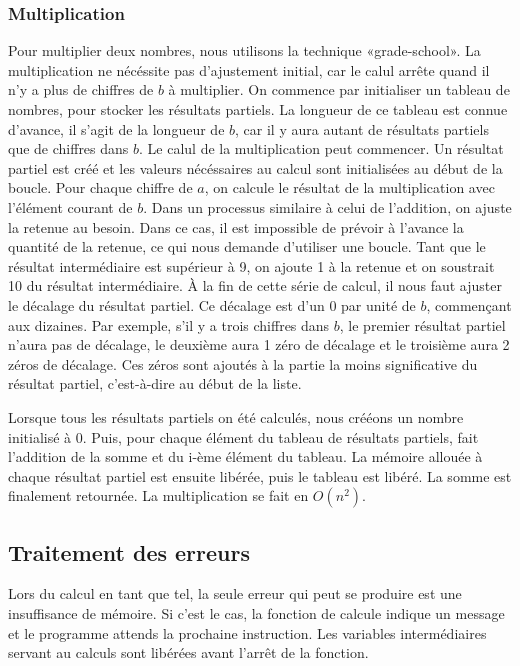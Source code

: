 \documentclass[letterpaper,12pt]{scrartcl}
\begin{document}
            \subsubsection{Multiplication}
             Pour multiplier deux nombres, nous utilisons la technique «grade-school». La multiplication ne nécéssite pas d'ajustement initial, car le calul arrête quand il n'y a plus de chiffres de $b$ à multiplier. On commence par initialiser un tableau de nombres, pour stocker les résultats partiels. La longueur de ce tableau est connue d'avance, il s'agit de la longueur de $b$, car il y aura autant de résultats partiels que de chiffres dans $b$. Le calul de la multiplication peut commencer. Un résultat partiel est créé et les valeurs nécéssaires au calcul sont initialisées au début de la boucle. Pour chaque chiffre de $a$, on calcule le résultat de la multiplication avec l'élément courant de $b$. Dans un processus similaire à celui de l'addition, on ajuste la retenue au besoin. Dans ce cas, il est impossible de prévoir à l'avance la quantité de la retenue, ce qui nous demande d'utiliser une boucle. Tant que le résultat intermédiaire est supérieur à 9, on ajoute 1 à la retenue et on soustrait 10 du résultat intermédiaire. À la fin de cette série de calcul, il nous faut ajuster le décalage du résultat partiel. Ce décalage est d'un 0 par unité de $b$, commençant aux dizaines. Par exemple, s'il y a trois chiffres dans $b$, le premier résultat partiel n'aura pas de décalage, le deuxième aura 1 zéro de décalage et le troisième aura 2 zéros de décalage. Ces zéros sont ajoutés à la partie la moins significative du résultat partiel, c'est-à-dire au début de la liste. 

             Lorsque tous les résultats partiels on été calculés, nous crééons un nombre initialisé à 0. Puis, pour chaque élément du tableau de résultats partiels, fait l'addition de la somme et du i-ème élément du tableau. La mémoire allouée à chaque résultat partiel est ensuite libérée, puis le tableau est libéré. La somme est finalement retournée. La multiplication se fait en $O(n^2)$.
            
        
        \subsection{Traitement des erreurs}
         Lors du calcul en tant que tel, la seule erreur qui peut se produire est une insuffisance de mémoire. Si c'est le cas, la fonction de calcule indique un message et le programme attends la prochaine instruction. Les variables intermédiaires servant au calculs sont libérées avant l'arrêt de la fonction.
		
\end{document}
